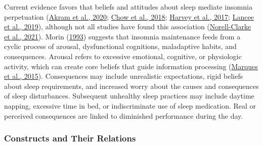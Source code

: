 \documentclass[
  ,doc,11pt, twoside,floatsintext]{apa6}
\begin{document}
Current evidence favors that beliefs and attitudes about sleep mediate insomnia perpetuation (\protect\hyperlink{ref-akram2020}{Akram et al., 2020}; \protect\hyperlink{ref-chow2018}{Chow et al., 2018}; \protect\hyperlink{ref-harvey2017}{Harvey et al., 2017}; \protect\hyperlink{ref-lancee2019}{Lancee et al., 2019}), although not all studies have found this association (\protect\hyperlink{ref-norell-clarke2021}{Norell-Clarke et al., 2021}). Morin (\protect\hyperlink{ref-morin1993}{1993}) suggests that insomnia maintenance feeds from a cyclic process of arousal, dysfunctional cognitions, maladaptive habits, and consequences. Arousal refers to excessive emotional, cognitive, or physiologic activity, which can create core beliefs that guide information processing (\protect\hyperlink{ref-marques2015}{Marques et al., 2015}). Consequences may include unrealistic expectations, rigid beliefs about sleep requirements, and increased worry about the causes and consequences of sleep disturbances. Subsequent unhealthy sleep practices may include daytime napping, excessive time in bed, or indiscriminate use of sleep medication. Real or perceived consequences are linked to diminished performance during the day.

\hypertarget{constructs-and-their-relations}{%
\subsubsection{Constructs and Their Relations}\label{constructs-and-their-relations}}
\end{document}
